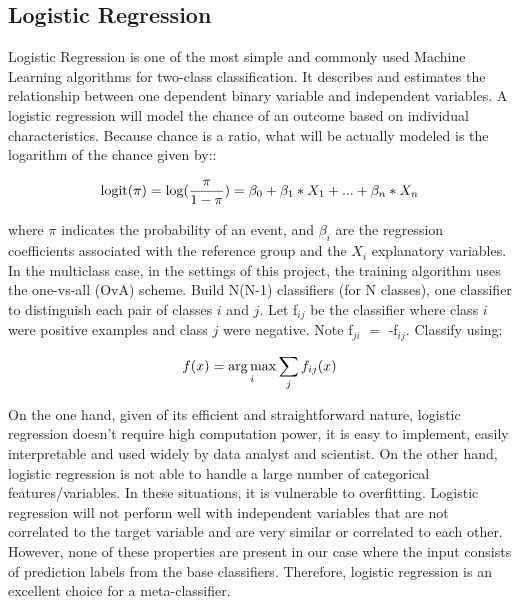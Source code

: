 \subsection{Logistic Regression}

Logistic Regression is one of the most simple and commonly used Machine Learning algorithms for two-class classification. It describes and estimates the relationship between one dependent binary variable and independent variables. A logistic regression will model the chance of an outcome based on individual characteristics. Because chance is a ratio, what will be actually modeled is the logarithm of the chance given by:: 

\begin{equation}
    \centering
    \text{logit($\pi$)} = \text{log}(\frac{\pi}{1 - \pi}) = \beta_0 + \beta_1 * X_1 + ... + \beta_n * X_n 
\end{equation} 

where $\pi$ indicates the probability of an event, and $\beta_i$ are the regression coefficients associated with the reference group and the $X_i$ explanatory variables. \\

In the multiclass case, in the settings of this project, the training algorithm uses the one-vs-all (OvA) scheme.
Build N(N-1) classifiers (for N classes), one classifier to distinguish each pair of classes $i$ and $j$. Let f$_{ij}$ be the classifier where class $i$ were positive examples and class $j$ were negative. Note f$_{ji}$ $=$ -f$_{ij}$. Classify using:

\begin{equation}
    \centering
    f(x) = \argmax_{i} \sum_{j} f_{ij}(x)
\end{equation} 

On the one hand, given of its efficient and straightforward nature, logistic regression doesn't require high computation power, it is easy to implement, easily interpretable and used widely by data analyst and scientist. On the other hand, logistic regression is not able to handle a large number of categorical features/variables. In these situations, it is vulnerable to overfitting. Logistic regression will not perform well with independent variables that are not correlated to the target variable and are very similar or correlated to each other. However, none of these properties are present in our case where the input consists of prediction labels from the base classifiers. Therefore, logistic regression is an excellent choice for a meta-classifier. 

